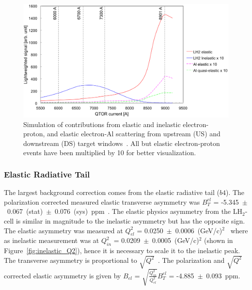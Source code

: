 \begin{figure}[!h]
	\begin{center}
	\includegraphics[width=15.0cm]{figures/qtorScan}
	\end{center}
	\caption
	{
Simulation of contributions from elastic and inelastic electron-proton, and elastic electron-Al scattering from upstream (US) and downstream (DS) target windows~\cite{elog:adesh_analysis837}. All but elastic electron-proton events have been multiplied by 10 for better visualization.}
	\label{fig:qtorScan}
\end{figure}


\subsubsection{Elastic Radiative Tail}
\label{Elastic Radiative Tail}
The largest background correction comes from the elastic radiative tail ($b4$). The polarization corrected measured elastic transverse asymmetry was $B_{T}^{el}$ = -5.345~$\pm$~0.067~(stat)~$\pm$~0.076~(sys)~ppm~\cite{presentation:BPWQweakTransverse_02_21_14}. The elastic physics asymmetry from the LH$_{2}$-cell is similar in magnitude to the inelastic asymmetry but has the opposite sign.
The elastic asymmetry was measured at $Q_{el}^{2}$ = 0.0250~$\pm$~0.0006~(GeV/c)$^{2}$~\cite{PhysRevLett.111.141803} where as inelastic measurement was at $Q_{in}^{2}$ = 0.0209~$\pm$~0.0005~(GeV/c)$^{2}$ (shown in Figure~\ref{fig:inelastic_Q2}), hence it is necessary to scale it to the inelastic peak. The transverse asymmetry is proportional to $\sqrt{Q^{2}}$~\cite{PhysRevC.72.034602, PhysRevC.77.044606}. The polarization and $\sqrt{Q^{2}}$ corrected elastic asymmetry is given by $B_{el}$ = $\sqrt{\frac{Q_{in}^{2}}{Q_{el}^{2}}}B_{T}^{el}$ = -4.885~$\pm$~0.093~ppm.

